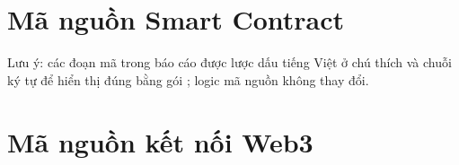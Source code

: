 \appendix
\renewcommand{\thesection}{Phụ lục \Alph{section}}
\section{Mã nguồn Smart Contract}
\label{sec:appendix}

Lưu ý: các đoạn mã trong báo cáo được lược dấu tiếng Việt ở chú thích và chuỗi ký tự để hiển thị đúng bằng gói ; logic mã nguồn không thay đổi.



\section{Mã nguồn kết nối Web3}



